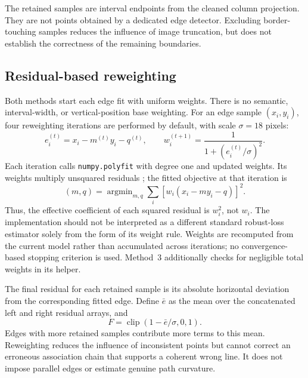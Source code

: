 The retained samples are interval endpoints from the cleaned column
projection. They are not points obtained by a dedicated edge detector.
Excluding border-touching samples reduces the influence of image
truncation, but does not establish the correctness of the remaining
boundaries.

\subsection{Residual-based reweighting}
\label{subsec:c4_robust_fit}

Both methods start each edge fit with uniform weights. There is no
semantic, interval-width, or vertical-position base weighting. For an
edge sample $(x_i,y_i)$, four reweighting iterations are performed by
default, with scale $\sigma=18$ pixels:
\begin{equation}
    e_i^{(t)}=x_i-m^{(t)}y_i-q^{(t)},\qquad
    w_i^{(t+1)}=\frac{1}{1+(e_i^{(t)}/\sigma)^2}.
    \label{eq:c4_reweight}
\end{equation}
Each iteration calls \texttt{numpy.polyfit} with degree one and updated
weights. Its weights multiply unsquared residuals
\cite{numpyPolyfitDocumentation}; the fitted objective at that iteration is
\begin{equation}
    (m,q)=\mathop{\arg\min}_{m,q}
        \sum_i \left[w_i(x_i-my_i-q)\right]^2.
    \label{eq:c4_objective}
\end{equation}
Thus, the effective coefficient of each squared residual is $w_i^2$,
not $w_i$. The implementation should not be interpreted as a different
standard robust-loss estimator solely from the form of its weight rule.
Weights are recomputed from the current model rather than accumulated
across iterations; no convergence-based stopping criterion is used.
Method~3 additionally checks for negligible total weights in its helper.

The final residual for each retained sample is its absolute horizontal
deviation from the corresponding fitted edge. Define $\bar e$ as the
mean over the concatenated left and right residual arrays, and
\begin{equation}
    F=\operatorname{clip}(1-\bar e/\sigma,0,1).
    \label{eq:c4_fit_score}
\end{equation}
Edges with more retained samples contribute more terms to this mean.
Reweighting reduces the influence of inconsistent points but cannot
correct an erroneous association chain that supports a coherent wrong
line. It does not impose parallel edges or estimate genuine path curvature.

